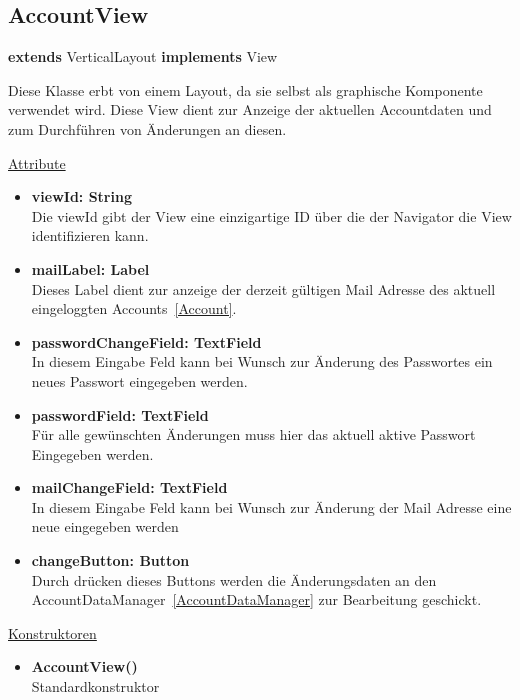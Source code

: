 \newpage
\subsection{AccountView}\label{AccountView}
\textbf{extends}  VerticalLayout \newline
\textbf{implements} View \newline

Diese Klasse erbt von einem Layout, da sie selbst als graphische Komponente verwendet wird. Diese View dient zur Anzeige der aktuellen Accountdaten und zum Durchführen von Änderungen an diesen.
\newline

\underline{Attribute}
\begin{itemize}
\itemsep0pt
\item \textbf{viewId: String} \hfill\\ 
Die viewId gibt der View eine einzigartige ID über die der Navigator die View identifizieren kann.

\item \textbf{mailLabel: Label} \hfill\\ 
Dieses Label dient zur anzeige der derzeit gültigen Mail Adresse des aktuell eingeloggten Accounts~\eqref{Account}.

\item \textbf{passwordChangeField: TextField} \hfill\\ 
In diesem Eingabe Feld kann bei Wunsch zur Änderung des Passwortes ein neues Passwort eingegeben werden.

\item \textbf{passwordField: TextField} \hfill\\ 
Für alle gewünschten Änderungen muss hier das aktuell aktive Passwort Eingegeben werden.

\item \textbf{mailChangeField: TextField} \hfill\\ 
In diesem Eingabe Feld kann bei Wunsch zur Änderung der Mail Adresse eine neue eingegeben werden

\item \textbf{changeButton: Button} \hfill\\
Durch drücken dieses Buttons werden die Änderungsdaten an den AccountDataManager~\eqref{AccountDataManager} zur Bearbeitung geschickt.
\end{itemize}

\underline{Konstruktoren}
\begin{itemize}
\itemsep0pt
\item \textbf{AccountView()} \hfill\\
Standardkonstruktor
\end{itemize}


